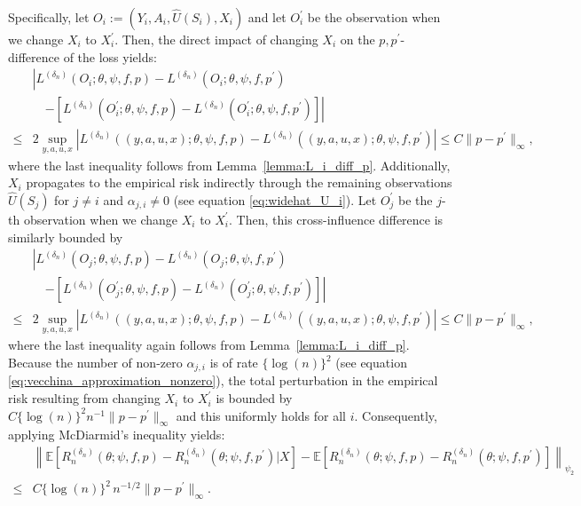 \documentclass[12pt]{article}
\newcommand{\E}{\mathbb{E}}
\begin{document}
Specifically, let $O_i:=(Y_i,A_i,\widehat U(S_i),X_i)$ and let $O_i^\prime$ be the observation when we change $X_i$ to $X_i^\prime$. Then, the direct impact of changing $X_i$ on the $p,p^\prime$-difference of the loss yields:
\begin{align*}
&\left|L^{(\delta_n)}(O_i;\theta,\psi,f,p) - L^{(\delta_n)}(O_i;\theta,\psi,f,p^\prime)\right.\\
        &\quad\left. -\left[L^{(\delta_n)}(O_i^\prime;\theta,\psi,f,p) - L^{(\delta_n)}(O_i^\prime;\theta,\psi,f,p^\prime)\right]\right|\\
        \leq  & 2\sup_{y,a,u,x}\left|L^{(\delta_n)}((y,a,u,x);\theta,\psi,f,p) - L^{(\delta_n)}((y,a,u,x);\theta,\psi,f,p^\prime)\right|
        \leq  C\|p-p^\prime\|_\infty,
\end{align*}
where the last inequality follows from Lemma~\ref{lemma:L_i_diff_p}. Additionally, $X_i$ propagates to the empirical risk indirectly through the remaining observations $\widehat U(S_j)$ for $j\neq i$ and $\alpha_{j,i}\neq 0$ (see equation \eqref{eq:widehat_U_i}). Let $O_j^\prime$ be the $j$-th observation when we change $X_i$ to $X_i^\prime$. Then, this cross-influence difference is similarly bounded by
\begin{align*}
&\left|L^{(\delta_n)}(O_j;\theta,\psi,f,p) - L^{(\delta_n)}(O_j;\theta,\psi,f,p^\prime)\right.\\
        &\quad\left.-\left[L^{(\delta_n)}(O_j^\prime;\theta,\psi,f,p) - L^{(\delta_n)}(O_j^\prime;\theta,\psi,f,p^\prime)\right]\right|\\
        \leq  & 2\sup_{y,a,u,x}\left|L^{(\delta_n)}((y,a,u,x);\theta,\psi,f,p) - L^{(\delta_n)}((y,a,u,x);\theta,\psi,f,p^\prime)\right|
        \leq  C\|p-p^\prime\|_\infty,
\end{align*}
where the last inequality again follows from Lemma~\ref{lemma:L_i_diff_p}. Because the number of non-zero $\alpha_{j,i}$ is of rate $\{\log(n)\}^2$ (see equation \eqref{eq:vecchina_approximation_nonzero}), the total perturbation in the empirical risk resulting from changing $X_i$ to $X_i^\prime$ is bounded by $C\{\log(n)\}^2 n^{-1}\|p-p^\prime\|_{\infty}$ and this uniformly holds for all $i$. Consequently, applying McDiarmid's inequality yields:
\begin{align*}
    &\left\|\E\left[R_n^{(\delta_n)}(\theta;\psi,f,p)-R_n^{({\delta_n})}(\theta;\psi,f,p^\prime)|X\right]-\E\left[R_n^{(\delta_n)}(\theta;\psi,f,p)-R_n^{({\delta_n})}(\theta;\psi,f,p^\prime)\right]\right\|_{\psi_2}\\
    \leq & C\{\log(n)\}^2\,n^{-1/2}\|p-p^\prime\|_{\infty}.
\end{align*}
\end{document}
